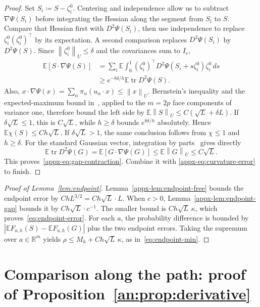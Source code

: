 \documentclass[11pt,letterpaper]{article}
\theoremstyle{remark}
\newcommand{\E}{\mathbb E}
\newcommand{\R}{\mathbb R}
\newcommand{\tr}{\operatorname{tr}}
\newcommand{\norm}[1]{\left\lVert#1\right\rVert}
\newcommand{\dd}{\,d}
\begin{document}
\begin{proof}
Set \(S_i\coloneqq S-\zeta_i^0\). Centering and independence
allow us to subtract \(\nabla\Psi(S_i)\) before integrating the
Hessian along the segment from \(S_i\) to \(S\).
Compare that Hessian first with \(D^2\Psi(S_i)\), then use
independence to replace \(\zeta_i^0(\zeta_i^0)^\top\) by its
expectation. A second comparison replaces \(D^2\Psi(S_i)\) by
\(D^2\Psi(S)\). Since \(\norm{\zeta_i^0}_U\le\delta\) and
the covariances sum to \(I_r\),
\[
 \begin{split}
 \E[S\cdot\nabla\Psi(S)]
 &=\sum_i\E\int_0^1
 (\zeta_i^0)^\top D^2\Psi(S_i+s\zeta_i^0)\zeta_i^0\dd s\\
 &\ge e^{-8\delta/h}\E\tr D^2\Psi(S).
 \end{split}
\]
Also, \(x\cdot\nabla\Psi(x)=\sum_\alpha\pi_\alpha(u_\alpha\cdot x)
\le\norm x_U\). Bernstein's inequality and the expected-maximum bound
in~\cite[Chapter~2]{BLM2013}, applied to the \(m=2p\) face
components of variance one, therefore bound the left side by
\(\E\norm S_U\le C(\sqrt L+\delta L)\).
If \(\delta\sqrt L\le1\), this is \(C\sqrt L\), while
\(h\ge\delta\) bounds \(e^{8\delta/h}\) absolutely. Hence
\(\E\chi(S)\le Ch\sqrt L\). If \(\delta\sqrt L>1\), the
same conclusion follows from \(\chi\le1\) and \(h\ge\delta\).
For the standard Gaussian vector, integration by parts~\cite{Stein1981}
gives directly
\[
 \E\tr D^2\Psi(G)=\E[G\cdot\nabla\Psi(G)]
 \le\E\norm G_U\le C\sqrt L.
\]
This proves~\eqref{appx-eq:gap-contraction}. Combine it with
\eqref{appx-eq:curvature-error} to finish.
\end{proof}

\begin{proof}[Proof of Lemma~\ref{lem:endpoint}]
Lemma~\ref{appx-lem:endpoint-free} bounds the endpoint error by
\(ChL^{3/2}=Ch\sqrt L\cdot L\). When \(c>0\),
Lemma~\ref{appx-lem:endpoint-gap} bounds it by
\(Ch\sqrt L\cdot c^{-1}\). The smaller bound is
\(Ch\sqrt L\,\kappa\), which proves~\eqref{eq:endpoint-error}.
For each \(a\), the probability difference is bounded by
\(|\E F_{a,h}(S)-\E F_{a,h}(G)|\) plus the two endpoint errors.
Taking the supremum over \(a\in\R^m\) yields
\(\rho\le M_h+Ch\sqrt L\,\kappa\), as in~\eqref{eq:endpoint-min}.
\end{proof}

\section{Comparison along the path: proof of Proposition~\ref{an:prop:derivative}}
\label{appx-sec:support}
\end{document}

